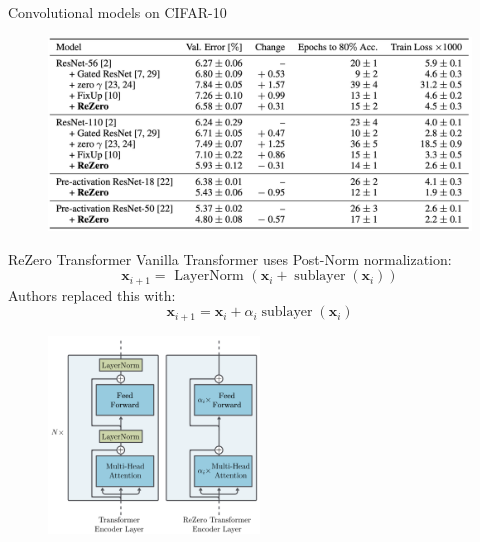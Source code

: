 \documentclass[handout, 10pt]{beamer}
\begin{document}
\begin{frame}{Convolutional models on CIFAR-10}
\begin{figure}
\centering
\includegraphics[width=\textwidth]{images/conv-models-cifar10}
\end{figure}
\end{frame}


\begin{frame}{ReZero Transformer}
Vanilla Transformer uses Post-Norm normalization:
\begin{equation}
\boldsymbol{x}_{i+1}=\text { LayerNorm }\left(\boldsymbol{x}_{i}+\operatorname{sublayer}\left(\boldsymbol{x}_{i}\right)\right)
\end{equation}
Authors replaced this with:
\begin{equation}
\boldsymbol{x}_{i+1}=\boldsymbol{x}_{i}+\alpha_{i} \operatorname{sublayer}\left(\boldsymbol{x}_{i}\right)
\end{equation}

\begin{figure}
\centering
\includegraphics[width=0.5\textwidth]{images/rezero-transformer.png}
\end{figure}
\end{frame}
\end{document}
